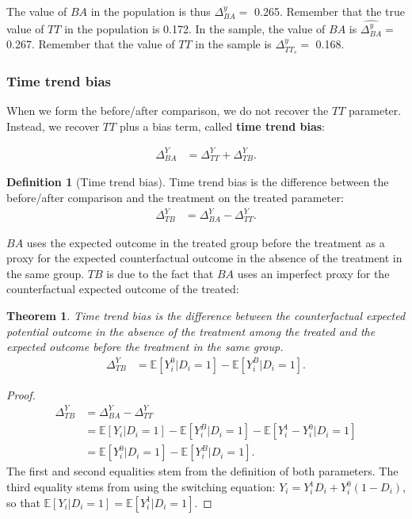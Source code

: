 \documentclass[
]{book}
\newcommand{\esp}[1]{\mathbb{E}[ #1 ]}
\newtheorem{theorem}{Theorem}[chapter]
\theoremstyle{definition}
\newtheorem{definition}{Definition}[chapter]
\theoremstyle{definition}
\theoremstyle{definition}
\theoremstyle{definition}
\theoremstyle{remark}
\begin{document}
The value of \(BA\) in the population is thus \(\Delta^y_{BA}=\) 0.265.
Remember that the true value of \(TT\) in the population is 0.172.
In the sample, the value of \(BA\) is \(\hat{\Delta^y_{BA}}=\) 0.267.
Remember that the value of \(TT\) in the sample is \(\Delta^y_{TT_s}=\) 0.168.

\hypertarget{time-trend-bias}{%
\subsubsection{Time trend bias}\label{time-trend-bias}}

When we form the before/after comparison, we do not recover the \(TT\) parameter.
Instead, we recover \(TT\) plus a bias term, called \textbf{time trend bias}:

\begin{align*}
\Delta^Y_{BA} & =\Delta^Y_{TT}+\Delta^Y_{TB}.
\end{align*}

\begin{definition}[Time trend bias]
\protect\hypertarget{def:unnamed-chunk-26}{}{\label{def:unnamed-chunk-26} \iffalse (Time trend bias) \fi{} }Time trend bias is the difference between the before/after comparison and the treatment on the treated parameter:
\begin{align*}
\Delta^Y_{TB} & = \Delta^Y_{BA}-\Delta^Y_{TT} .
\end{align*}
\end{definition}

\(BA\) uses the expected outcome in the treated group before the treatment as a proxy for the expected counterfactual outcome in the absence of the treatment in the same group.
\(TB\) is due to the fact that \(BA\) uses an imperfect proxy for the counterfactual expected outcome of the treated:

\begin{theorem}
\protect\hypertarget{thm:TB}{}{\label{thm:TB} }Time trend bias is the difference between the counterfactual expected potential outcome in the absence of the treatment among the treated and the expected outcome before the treatment in the same group.
\begin{align*}
\Delta^Y_{TB} & = \esp{Y_i^0|D_i=1}-\esp{Y_i^B|D_i=1}.
\end{align*}
\end{theorem}

\begin{proof}
\iffalse{} {Proof. } \fi{}\begin{align*}
\Delta^Y_{TB} & = \Delta^Y_{BA}-\Delta^Y_{TT} \\
              & = \esp{Y_i|D_i=1}-\esp{Y^B_i|D_i=1}-\esp{Y_i^1-Y_i^0|D_i=1}\\
              & = \esp{Y_i^0|D_i=1}-\esp{Y_i^B|D_i=1}.
\end{align*}
The first and second equalities stem from the definition of both parameters.
The third equality stems from using the switching equation: \(Y_i=Y_i^1D_i+Y_i^0(1-D_i)\), so that \(\esp{Y_i|D_i=1}=\esp{Y^1_i|D_i=1}\).
\end{proof}
\end{document}
